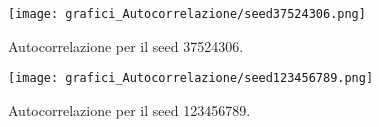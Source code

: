 \begin{figure}[H]
	\begin{center}
	\texttt{[image: grafici\_Autocorrelazione/seed37524306.png]}
	\caption[Autocorrelazione per il seed 37524306]{Autocorrelazione per il seed 37524306.}
	\label{fig:exp_res_time}
	\end{center}
\end{figure}

\begin{figure}[H]
	\begin{center}
	\texttt{[image: grafici\_Autocorrelazione/seed123456789.png]}
	\caption[Autocorrelazione per il seed 123456789]{Autocorrelazione per il seed 123456789.}
	\label{fig:exp_res_time}
	\end{center}
\end{figure}
